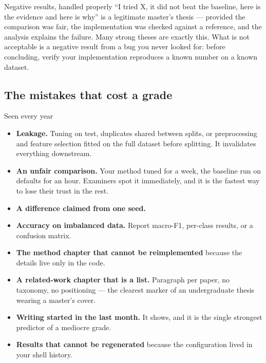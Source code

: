 \documentclass[11pt,a4paper]{article}
\begin{document}
\begin{wbox}{Negative results, handled properly}
``I tried X, it did not beat the baseline, here is the evidence and here is
why'' is a legitimate master's thesis --- provided the comparison was fair,
the implementation was checked against a reference, and the analysis explains
the failure. Many strong theses are exactly this. What is not acceptable is a
negative result from a bug you never looked for: before concluding, verify
your implementation reproduces a known number on a known dataset.
\end{wbox}

\subsection{The mistakes that cost a grade}

\begin{wbox}{Seen every year}
\begin{itemize}
  \item \textbf{Leakage.} Tuning on test, duplicates shared between splits, or
        preprocessing and feature selection fitted on the full dataset before
        splitting. It invalidates everything downstream.
  \item \textbf{An unfair comparison.} Your method tuned for a week, the
        baseline run on defaults for an hour. Examiners spot it immediately,
        and it is the fastest way to lose their trust in the rest.
  \item \textbf{A difference claimed from one seed.}
  \item \textbf{Accuracy on imbalanced data.} Report macro-F1, per-class
        results, or a confusion matrix.
  \item \textbf{The method chapter that cannot be reimplemented} because the
        details live only in the code.
  \item \textbf{A related-work chapter that is a list.} Paragraph per paper,
        no taxonomy, no positioning --- the clearest marker of an
        undergraduate thesis wearing a master's cover.
  \item \textbf{Writing started in the last month.} It shows, and it is the
        single strongest predictor of a mediocre grade.
  \item \textbf{Results that cannot be regenerated} because the configuration
        lived in your shell history.
\end{itemize}
\end{wbox}
\end{document}
